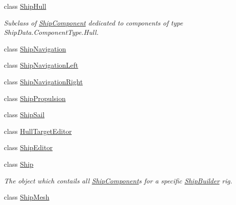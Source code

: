 \begin{DoxyCompactItemize}
class \hyperlink{class_skyrates_1_1_client_1_1_ship_1_1_ship_hull}{Ship\-Hull}
\begin{DoxyCompactList}\small\item\em Subclass of \hyperlink{class_skyrates_1_1_client_1_1_ship_1_1_ship_component}{Ship\-Component} dedicated to components of type Ship\-Data.\-Component\-Type.\-Hull. \end{DoxyCompactList}\item 
class \hyperlink{class_skyrates_1_1_client_1_1_ship_1_1_ship_navigation}{Ship\-Navigation}
\item 
class \hyperlink{class_skyrates_1_1_client_1_1_ship_1_1_ship_navigation_left}{Ship\-Navigation\-Left}
\item 
class \hyperlink{class_skyrates_1_1_client_1_1_ship_1_1_ship_navigation_right}{Ship\-Navigation\-Right}
\item 
class \hyperlink{class_skyrates_1_1_client_1_1_ship_1_1_ship_propulsion}{Ship\-Propulsion}
\item 
class \hyperlink{class_skyrates_1_1_client_1_1_ship_1_1_ship_sail}{Ship\-Sail}
\item 
class \hyperlink{class_skyrates_1_1_client_1_1_ship_1_1_hull_target_editor}{Hull\-Target\-Editor}
\item 
class \hyperlink{class_skyrates_1_1_client_1_1_ship_1_1_ship_editor}{Ship\-Editor}
\item 
class \hyperlink{class_skyrates_1_1_client_1_1_ship_1_1_ship}{Ship}
\begin{DoxyCompactList}\small\item\em The object which contails all \hyperlink{class_skyrates_1_1_client_1_1_ship_1_1_ship_component}{Ship\-Component}s for a specific \hyperlink{class_skyrates_1_1_client_1_1_ship_1_1_ship_builder}{Ship\-Builder} rig. \end{DoxyCompactList}\item 
class \hyperlink{class_skyrates_1_1_client_1_1_ship_1_1_ship_mesh}{Ship\-Mesh}
\end{DoxyCompactItemize}

